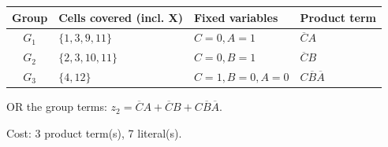 \documentclass[a4paper,11pt]{article}
\begin{document}
\begin{minipage}{\textwidth}
\begin{center}\small
\begin{tabular}{clll}
\toprule
Group & Cells covered (incl. X) & Fixed variables & Product term\\\midrule
\textcolor{blue!75!black}{$G_{1}$} & $\{1,3,9,11\}$ & $C=0,A=1$ & $\overline{C}A$\\
\textcolor{red!75!black}{$G_{2}$} & $\{2,3,10,11\}$ & $C=0,B=1$ & $\overline{C}B$\\
\textcolor{teal!80!black}{$G_{3}$} & $\{4,12\}$ & $C=1,B=0,A=0$ & $C\overline{B}\overline{A}$\\
\bottomrule\end{tabular}\end{center}


\noindent OR the group terms: $\boxed{z_2=\overline{C}A + \overline{C}B + C\overline{B}\overline{A}}$.

\noindent Cost: 3 product term(s), 7 literal(s).

\end{minipage}\par\vspace{0.25cm}

\clearpage
\end{document}
